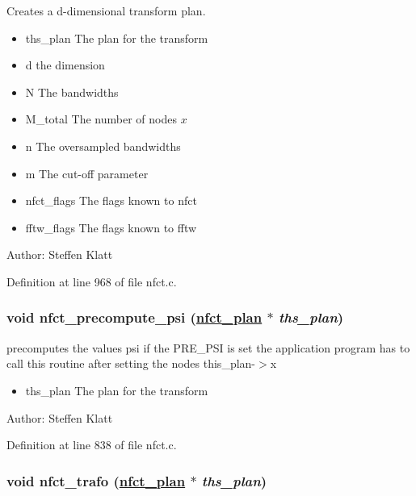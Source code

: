 Creates a d-dimensional transform plan. 

\begin{itemize}
\item ths\_\-plan The plan for the transform \item d the dimension \item N The bandwidths \item M\_\-total The number of nodes $x$ \item n The oversampled bandwidths \item m The cut-off parameter \item nfct\_\-flags The flags known to nfct \item fftw\_\-flags The flags known to fftw\end{itemize}
\begin{Desc}
\item[Author:]Steffen Klatt \end{Desc}


Definition at line 968 of file nfct.c.\hypertarget{group__nfsct_ga5}{
\subsubsection[nfct\_\-precompute\_\-psi]{\setlength{\rightskip}{0pt plus 5cm}void nfct\_\-precompute\_\-psi (\hyperlink{structnfct__plan}{nfct\_\-plan} $\ast$ {\em ths\_\-plan})}}
\label{group__nfsct_ga5}


precomputes the values psi if the PRE\_\-PSI is set the application program has to call this routine after setting the nodes this\_\-plan-$>$x 

\begin{itemize}
\item ths\_\-plan The plan for the transform\end{itemize}
\begin{Desc}
\item[Author:]Steffen Klatt \end{Desc}


Definition at line 838 of file nfct.c.\hypertarget{group__nfsct_ga6}{
\subsubsection[nfct\_\-trafo]{\setlength{\rightskip}{0pt plus 5cm}void nfct\_\-trafo (\hyperlink{structnfct__plan}{nfct\_\-plan} $\ast$ {\em ths\_\-plan})}}
\label{group__nfsct_ga6}


